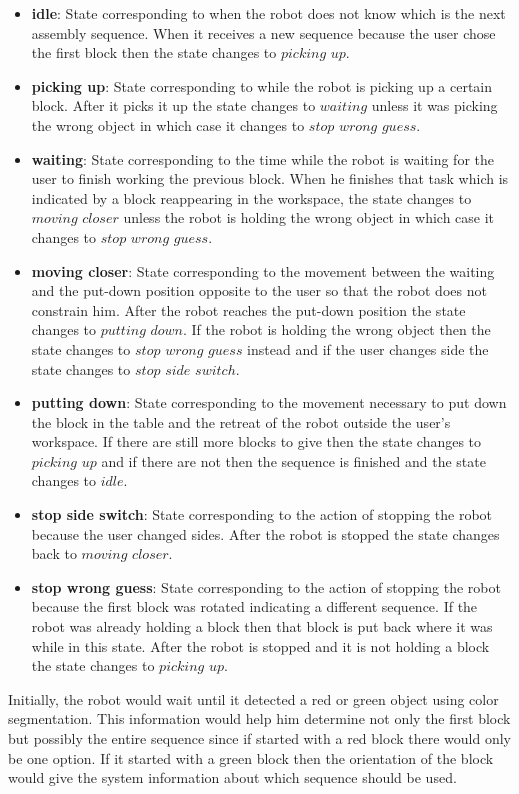 \begin{itemize}
    \item \textbf{idle}: State corresponding to when the robot does not know which is the next assembly sequence. When it receives a new sequence because the user chose the first block then the state changes to $picking$ $up$.
    \item \textbf{picking up}: State corresponding to while the robot is picking up a certain block. After it picks it up the state changes to $waiting$ unless it was picking the wrong object in which case it changes to $stop$ $wrong$ $guess$.
    \item \textbf{waiting}: State corresponding to the time while the robot is waiting for the user to finish working the previous block. When he finishes that task which is indicated by a block reappearing in the workspace, the state changes to $moving$ $closer$ unless the robot is holding the wrong object in which case it changes to $stop$ $wrong$ $guess$.
    \item \textbf{moving closer}: State corresponding to the movement between the waiting and the put-down position opposite to the user so that the robot does not constrain him. After the robot reaches the put-down position the state changes to $putting$ $down$. If the robot is holding the wrong object then the state changes to $stop$ $wrong$ $guess$ instead and if the user changes side the state changes to $stop$ $side$ $switch$.
    \item \textbf{putting down}: State corresponding to the movement necessary to put down the block in the table and the retreat of the robot outside the user's workspace. If there are still more blocks to give then the state changes to $picking$ $up$ and if there are not then the sequence is finished and the state changes to $idle$.
    \item \textbf{stop side switch}: State corresponding to the action of stopping the robot because the user changed sides. After the robot is stopped the state changes back to $moving$ $closer$.
    \item \textbf{stop wrong guess}: State corresponding to the action of stopping the robot because the first block was rotated indicating a different sequence. If the robot was already holding a block then that block is put back where it was while in this state. After the robot is stopped and it is not holding a block the state changes to $picking$ $up$.
\end{itemize}

Initially, the robot would wait until it detected a red or green object using color segmentation. This information would help him determine not only the first block but possibly the entire sequence since if started with a red block there would only be one option. If it started with a green block then the orientation of the block would give the system information about which sequence should be used.

